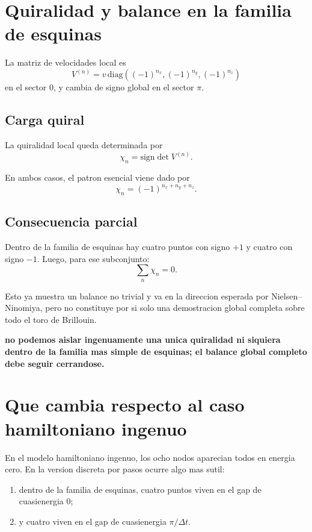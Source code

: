 \section{Quiralidad y balance en la familia de esquinas}
La matriz de velocidades local es
\begin{equation}
V^{(n)}=
v\,\mathrm{diag}\!\left(
(-1)^{n_x},
(-1)^{n_y},
(-1)^{n_z}
\right)
\end{equation}
en el sector \(0\), y cambia de signo global en el sector \(\pi\).

\subsection{Carga quiral}
La quiralidad local queda determinada por
\begin{equation}
\chi_n = \mathrm{sign}\det V^{(n)}.
\end{equation}

En ambos casos, el patron esencial viene dado por
\begin{equation}
\chi_n = (-1)^{n_x+n_y+n_z}.
\label{c32:eq:chi}
\end{equation}

\subsection{Consecuencia parcial}
Dentro de la familia de esquinas hay cuatro puntos con signo \(+1\) y cuatro con signo \(-1\). Luego, para ese subconjunto:
\begin{equation}
\sum_n \chi_n = 0.
\label{c32:eq:sumzero}
\end{equation}

Esto ya muestra un balance no trivial y va en la direccion esperada por Nielsen--Ninomiya, pero no constituye por si solo una demostracion global completa sobre todo el toro de Brillouin.

\begin{displayquote}
\textbf{no podemos aislar ingenuamente una unica quiralidad ni siquiera dentro de la familia mas simple de esquinas; el balance global completo debe seguir cerrandose.}
\end{displayquote}

\section{Que cambia respecto al caso hamiltoniano ingenuo}
En el modelo hamiltoniano ingenuo, los ocho nodos aparecian todos en energia cero. En la version discreta por pasos ocurre algo mas sutil:
\begin{enumerate}[label=\arabic*.]
    \item dentro de la familia de esquinas, cuatro puntos viven en el gap de cuasienergia \(0\);
    \item y cuatro viven en el gap de cuasienergia \(\pi/\Delta t\).
\end{enumerate}


